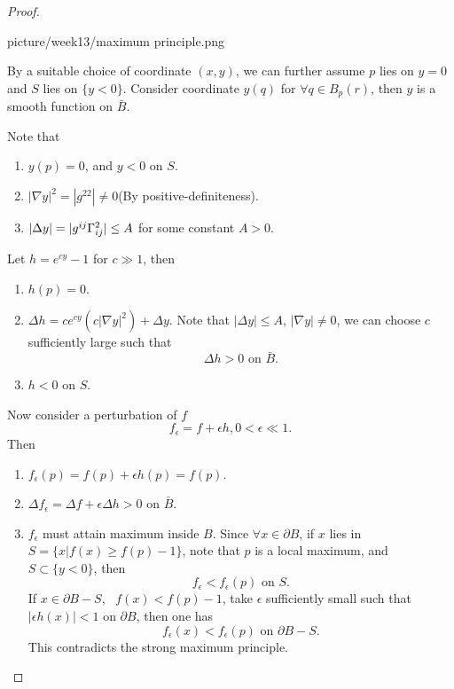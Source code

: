 \begin{enumerate}
\begin{proof}
\begin{center}
{                    picture/week13/maximum principle.png}
            \end{center}
            By a suitable choice of coordinate \((x,y)\), we can further
            assume \(p\) lies on \(y=0\) and \(S\) lies on \(\{y<0\}\).
            Consider coordinate \(y(q)\) for \(\forall q\in B_p(r)\),
            then \(y\) is a smooth function on \(\bar{B}\).
            
            Note that
            \begin{enumerate}[(1)]
                \item \(y(p)=0\), and \(y<0\) on \(S\).
                \item \(|\nabla y|^2=|g^{22}|\neq 0\)(By
                positive-definiteness).
                \item \(|\Delta y|=|g^{ij}\Gamma\indices*{_{ij}^2}|
                \le A\) for some constant \(A>0\).
            \end{enumerate}
            Let \(h=e^{cy}-1\) for \(c\gg 1\), then
            \begin{enumerate}[(1)]
                \item \(h(p)=0\).
                \item \(\Delta h=c e^{cy}\left(c|\nabla y|^2\right)+
                \Delta y\). Note that \(|\Delta y|\le A\),
                \(|\nabla y|\neq 0\), we
                can choose \(c\) sufficiently large such that
                \[
                    \Delta h>0 \text{ on } \bar{B}.    
                \]
                \item \(h<0\) on \(S\).
            \end{enumerate}
Now consider a perturbation of \(f\)
\[
    f_\epsilon=f+\epsilon h,0<\epsilon\ll 1.
\]
Then
\begin{enumerate}[(1)]
    \item \(f_\epsilon(p)=f(p)+\epsilon h(p)=f(p)\).
    \item \(\Delta f_\epsilon=\Delta f+\epsilon \Delta h>0\) on \(\bar{B}\).
    \item \(f_\epsilon\) must attain maximum inside \(B\). Since
    \(\forall x\in \partial B\), if \(x\) lies in \(S=\{x|f(x)\ge f(p)-1\}\),
    note that \(p\) is a local maximum, and \(S\subset \{y<0\}\), then 
    \[f_\epsilon< f_\epsilon(p) \text{ on }S.\]
    If \(x\in \partial B- S\), \ie\ \(f(x)< f(p)-1\), take \(\epsilon\)
    sufficiently small such that \(|\epsilon h(x)|<1\) on \(\partial B\),
    then one has 
    \[f_\epsilon(x)<f_\epsilon(p) \text{ on }\partial B-S.\]
    This contradicts the strong maximum principle.
\end{enumerate}
\end{proof}
\end{enumerate}
